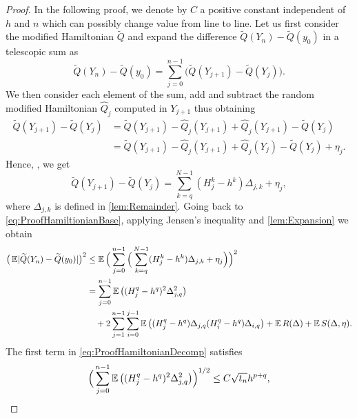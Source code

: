 \documentclass[10pt]{article}
\begin{document}
\begin{proof} In the following proof, we denote by $C$ a positive constant independent of $h$ and $n$ which can possibly change value from line to line. Let us first consider the modified Hamiltonian $\tilde Q$ and expand the difference $\tilde Q(Y_n) - \tilde Q(y_0)$ in a telescopic sum as
	\begin{equation}\label{eq:ProofHamiltionianBase}
	\tilde Q(Y_n) - \tilde Q(y_0) = \sum_{j=0}^{n-1} \big(\tilde Q(Y_{j+1}) - \tilde Q(Y_j)\big).
	\end{equation}
	We then consider each element of the sum, add and subtract the random modified Hamiltonian $\hat Q_j$ computed in $Y_{j+1}$ thus obtaining
	\begin{equation}
	\begin{aligned}
	\tilde Q(Y_{j+1}) - \tilde Q(Y_j) &= \tilde Q(Y_{j+1}) - \hat Q_j(Y_{j+1}) + \hat Q_j(Y_{j+1}) - \tilde Q(Y_j) \\
	&= \tilde Q(Y_{j+1}) - \hat Q_j(Y_{j+1}) + \hat Q_j(Y_j) - \tilde Q(Y_j) + \eta_j.
	\end{aligned}
	\end{equation}
	Hence, , we get
	\begin{equation}
	\tilde Q(Y_{j+1}) - \tilde Q(Y_j) = \sum_{k=q}^{N-1} (H_j^k - h^k)\Delta_{j,k} + \eta_j,
	\end{equation}
	where $\Delta_{j,k}$ is defined in \cref{lem:Remainder}.	Going back to \eqref{eq:ProofHamiltionianBase}, applying Jensen's inequality and \cref{lem:Expansion} we obtain
	\begin{equation}\label{eq:ProofHamiltonianDecomp}
	\begin{aligned}
	\big(\operatorname{\mathbb{E}} \lvert\widetilde Q(Y_n) - \widetilde Q(y_0)\rvert\big)^2 &\leq \operatorname{\mathbb{E}} \Big(\sum_{j=0}^{n-1} \Big(\sum_{k=q}^{N-1}(H_j^k - h^k)\Delta_{j,k} + \eta_j \Big) \Big)^2 \\
	&= \sum_{j=0}^{n-1}\operatorname{\mathbb{E}}\big((H_j^q - h^q)^2 \Delta_{j,q}^2\big) \\
	&\quad + 2\sum_{j=1}^{n-1}\sum_{i=0}^{j-1} \operatorname{\mathbb{E}}\big((H_j^q - h^q)\Delta_{j,q}(H_i^q - h^q) \Delta_{i,q}\big) + \operatorname{\mathbb{E}} R(\Delta) + \operatorname{\mathbb{E}} S(\Delta, \eta).
	\end{aligned}
	\end{equation}
	The first term in \eqref{eq:ProofHamiltonianDecomp} satisfies
	\begin{equation}\label{eq:BoundFirstTerm}
		\Big(\sum_{j=0}^{n-1}\E\big((H_j^q - h^q)^2 \Delta_{j,q}^2\big)\Big)^{1/2} \leq C \sqrt{t_n} h^{p+q},

\end{equation}
\end{proof}
\end{document}

